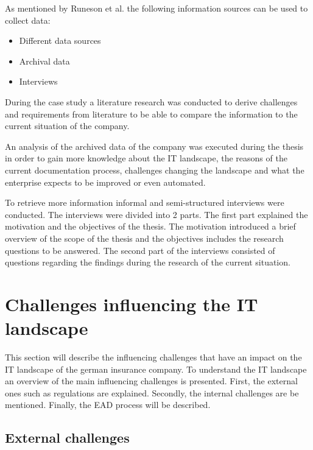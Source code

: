 As mentioned by Runeson et al. \cite{Runeson2009} the following information sources can be used to collect data:

\begin{itemize}
    \item Different data sources
    \item Archival data
    \item Interviews
\end{itemize}


During the case study a literature research was conducted to derive challenges and requirements from literature to be able to compare the information to the current situation of the company.

An analysis of the archived data of the company was executed during the thesis in order to gain more knowledge about the IT landscape, the reasons of the current documentation process, challenges changing the landscape and what the enterprise expects to be improved or even automated.

To retrieve more information informal and semi-structured interviews were conducted. The interviews were divided into 2 parts. The first part explained the motivation and the objectives of the thesis. The motivation introduced a brief overview of the scope of the thesis and the objectives includes the research questions to be answered. The second part of the interviews consisted of questions regarding the findings during the research of the current situation.

\section{Challenges influencing the IT landscape}\label{section:influencingfactors}

This section will describe the influencing challenges that have an impact on the IT landscape of the german insurance company. To understand the IT landscape an overview of the main influencing challenges is presented. First, the external ones such as regulations are explained. Secondly, the internal challenges are be mentioned. Finally, the EAD process will be described. 

\subsection{External challenges}\label{subsection:externalinfluencingfactors}

